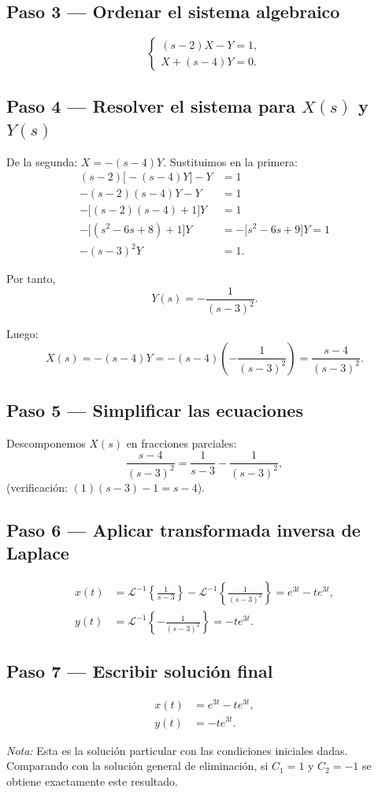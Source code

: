 \documentclass[10pt,a4paper]{article}
\begin{document}
\subsection{Paso 3 --- Ordenar el sistema algebraico}
\[
\begin{cases}
(s - 2)X - Y = 1,\\
X + (s - 4)Y = 0.
\end{cases}
\]

\subsection{Paso 4 --- Resolver el sistema para \(X(s)\) y \(Y(s)\)}

De la segunda: \(X = -(s - 4)Y\). Sustituimos en la primera:
\[
\begin{aligned}
(s - 2)\bigl[-(s - 4)Y\bigr] - Y &= 1 \\
-(s - 2)(s - 4)Y - Y &= 1 \\
-\bigl[(s - 2)(s - 4) + 1\bigr]Y &= 1 \\
-\bigl[(s^{2} - 6s + 8) + 1\bigr]Y &= -\bigl[s^{2} - 6s + 9\bigr]Y = 1 \\
-(s - 3)^{2} Y &= 1.
\end{aligned}
\]

Por tanto,
\[
Y(s) = -\frac{1}{(s - 3)^{2}}.
\]

Luego:
\[
X(s) = -(s - 4)Y = -(s - 4)\left(-\frac{1}{(s - 3)^{2}}\right)
      = \frac{s - 4}{(s - 3)^{2}}.
\]

\subsection{Paso 5 --- Simplificar las ecuaciones}

Descomponemos \(X(s)\) en fracciones parciales:
\[
\frac{s - 4}{(s - 3)^{2}} = \frac{1}{s - 3} - \frac{1}{(s - 3)^{2}},
\]
(verificación: \((1)(s - 3) - 1 = s - 4\)).

\subsection{Paso 6 --- Aplicar transformada inversa de Laplace}
\[
\begin{aligned}
x(t) &= \mathcal{L}^{-1}\!\left\{\frac{1}{s - 3}\right\}
      - \mathcal{L}^{-1}\!\left\{\frac{1}{(s - 3)^{2}}\right\}
      = e^{3t} - t e^{3t},\\[3pt]
y(t) &= \mathcal{L}^{-1}\!\left\{-\frac{1}{(s - 3)^{2}}\right\}
      = -t e^{3t}.
\end{aligned}
\]

\subsection{Paso 7 --- Escribir solución final}
\[
\boxed{
\begin{aligned}
x(t) &= e^{3t} - t e^{3t},\\[2pt]
y(t) &= -t e^{3t}.
\end{aligned}
}
\]

\medskip
\noindent\textit{Nota:} Esta es la solución particular con las condiciones iniciales dadas. Comparando con la solución general de eliminación, si \(C_{1}=1\) y \(C_{2}=-1\) se obtiene exactamente este resultado.
\end{document}
